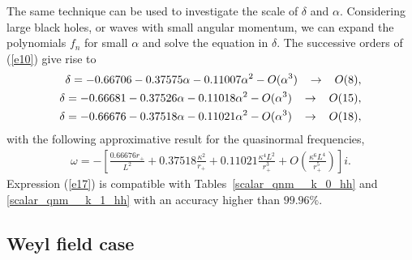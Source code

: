 \documentclass[preprint]{revtex4-1}
\def\be{\begin{eqnarray}}
\def\ee{\end{eqnarray}}
\begin{document}
The same technique can be used to investigate the scale of $\delta$ and $\alpha$. Considering large black holes, or waves with small angular momentum, we can expand the polynomials $f_n$ for small $\alpha$ and solve the equation in $\delta$. The successive orders of (\ref{e10}) give rise to
\be
\label{e14}
\delta = -0.66706 - 0.37575\alpha - 0.11007\alpha^2 -O(\alpha^3) \hspace{0.3cm} \rightarrow \hspace{0.3cm} O(8), \\
\delta = -0.66681 - 0.37526\alpha - 0.11018\alpha^2 -O(\alpha^3) \hspace{0.3cm} \rightarrow \hspace{0.3cm} O(15),\\
\delta = -0.66676 - 0.37518\alpha - 0.11021\alpha^2 -O(\alpha^3) \hspace{0.3cm} \rightarrow \hspace{0.3cm} O(18),
\ee
with the following approximative result for the quasinormal frequencies,
\be
\label{e17}
\omega= -\left[ \frac{0.66676 r_+}{L^2} + 0.37518\frac{\kappa^2}{r_+} + 0.11021\frac{\kappa^4L^2}{r_+^3} + O\left(\frac{\kappa^6L^4}{r_+^5}\right) \right]i.
\ee
Expression (\ref{e17}) is compatible with Tables~\ref{scalar_qnm__k_0_hh} and \ref{scalar_qnm__k_1_hh} with an accuracy higher than $99.96\%$.

\subsection*{Weyl field case}
\end{document}
